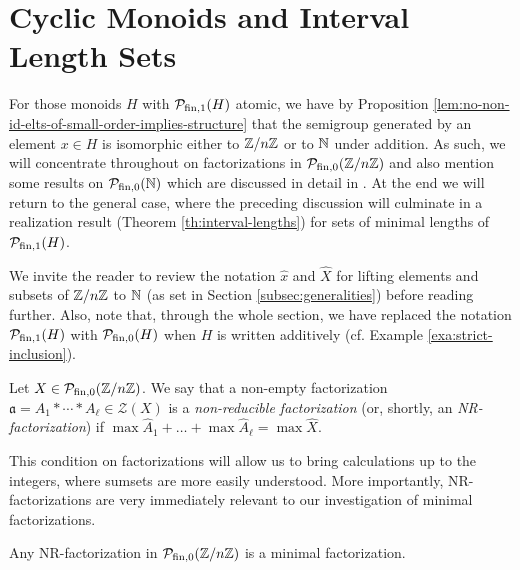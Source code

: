 \section{Cyclic Monoids and Interval Length Sets}
\label{sec:cyclic-case} 
For those monoids $H$ with $\mathcal{P}_{\textrm{fin}, 1}(H)$ atomic, we have by Proposition \ref{lem:no-non-id-elts-of-small-order-implies-structure} that the semigroup generated by an element $x\in H$ is isomorphic either to $\mathbb{Z}/n\mathbb{Z}$ or to $\mathbb{N}$ under addition.
As such, we will concentrate throughout on factorizations in $\mathcal{P}_{\textrm{fin},0}(\mathbb{Z}/n\mathbb{Z})$ and also mention some results on $\mathcal{P}_{\textrm{fin},0}(\mathbb{N})$ which are discussed in detail in \cite[Section 4]{fan-tringali18}.
At the end we will return to the general case, where the preceding discussion will culminate in a realization result (Theorem \ref{th:interval-lengths}) for sets of minimal lengths of $\mathcal{P}_{\textrm{fin}, 1}(H)$.

We invite the reader to review the notation $\hat{x}$ and $\hat{X}$ for lifting elements and subsets of $\mathbb{Z}/n\mathbb{Z}$ to $\mathbb{N}$ (as set in Section \ref{subsec:generalities}) before reading further. 
Also, note that, through the whole section, we have replaced the notation $\mathcal{P}_{\textrm{fin}, 1}(H)$ with $\mathcal{P}_{\textrm{fin},0}(H)$ when $H$ is written additively (cf. Example \ref{exa:strict-inclusion}).


\begin{defn}\label{NR-factorization}
	Let $X \in \mathcal P_{\textrm{fin},0}(\mathbb{Z}/n\mathbb{Z})$. We say that a non-empty factorization $\mathfrak a = A_1 \ast \cdots \ast A_\ell \in \mathcal{Z}(X)$ is a \emph{non-reducible factorization} (or, shortly, an \emph{\textup{NR}-factorization}) if $ \max\hat{A}_1 + \dots + \max\hat{A}_\ell = \max \hat{X}$.
\end{defn}

This condition on factorizations will allow us to bring calculations up to the integers, where sumsets are more easily understood.
More importantly, NR-factorizations are very immediately relevant to our investigation of minimal factorizations.

\begin{lemma}\label{NR-factorizations-are-minimal}
Any \textup{NR}-factorization in $\mathcal{P}_{\textrm{fin},0}(\mathbb{Z}/n\mathbb{Z})$ is a minimal factorization.
\end{lemma}

